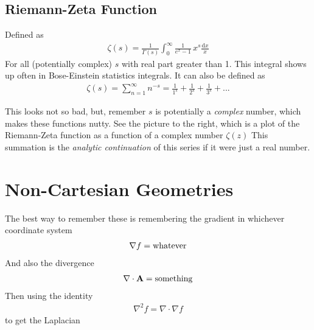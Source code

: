 \subsection{Riemann-Zeta Function}

Defined as
\begin{align}
	\zeta(s) = \frac{1}{\Gamma(s)} \int_{0}^{\infty} \frac{1}{e ^ x - 1}\,x ^ s \frac{\mathrm{d}x}{x} 
\end{align}
For all (potentially complex) $s$ with real part greater than 1. This integral shows up often in Bose-Einstein statistics integrals. It can also be defined as 
\begin{align}
	\zeta(s) = \sum_{n=1}^\infty n^{-s} = \frac{1}{1^s} + \frac{1}{2^s} + \frac{1}{3^s} + ...
\end{align}

\begin{multicols}{2}
	This looks not so bad, but, remember $s$ is potentially a \emph{complex} number, which makes these functions nutty. See the picture to the right, which is a plot of the Riemann-Zeta function as a function of a complex number $\zeta(z)$ This summation is the \emph{analytic continuation} of this series if it were just a real number. 
\columnbreak





\end{multicols}




\section{Non-Cartesian Geometries}

The best way to remember these is remembering the gradient in whichever coordinate system
\begin{align}
\nabla f = \rm{whatever}
\end{align}
And also the divergence
\begin{align}
\nabla\cdot\textbf{A} = \rm{something}
\end{align}
Then using the identity
\begin{align}
\nabla^2 f = \nabla\cdot\nabla f
\end{align}
to get the Laplacian


